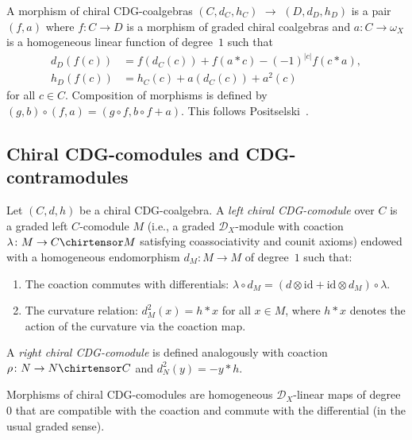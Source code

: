 \begin{remark}
\label{rem:CDG-morphisms}
A morphism of chiral CDG-coalgebras $(C, d_C, h_C)$
$\to$ $(D, d_D, h_D)$ is a pair $(f, a)$ where
$f\colon C \to D$ is a morphism of graded chiral
coalgebras and $a\colon C \to \omega_X$
is a homogeneous linear function of degree~$1$ such
that
\begin{align*}
d_D(f(c)) &= f(d_C(c)) + f(a \ast c) - (-1)^{|c|}f(c \ast a), \\
h_D(f(c)) &= h_C(c) + a(d_C(c)) + a^2(c)
\end{align*}
for all $c \in C$.
Composition of morphisms is defined by
$(g, b) \circ (f, a) = (g \circ f,\allowbreak b \circ f + a)$.
This follows Positselski~\cite[\S4.1]{Positselski11}.
\end{remark}

\subsection{Chiral CDG-comodules and CDG-contramodules}
\label{subsec:chiral-CDG-comod-contra}

\begin{definition}\label{def:chiral-CDG-comodule}
Let $(C, d, h)$ be a chiral CDG-coalgebra.  A \emph{left chiral
CDG-comodule} over $C$ is a graded left $C$-comodule $M$
(i.e., a graded $\mathcal{D}_X$-module with coaction
$\lambda\colon M \to C \chirtensor M$ satisfying coassociativity
and counit axioms) endowed with a homogeneous endomorphism
$d_M\colon M \to M$ of degree~$1$ such that:
\begin{enumerate}
\item The coaction commutes with differentials:
  $\lambda \circ d_M = (d \otimes \mathrm{id} + \mathrm{id} \otimes d_M) \circ \lambda$.
\item The curvature relation:
  $d_M^2(x) = h \ast x$ for all $x \in M$,
  where $h \ast x$ denotes the action of the curvature
  via the coaction map.
\end{enumerate}

A \emph{right chiral CDG-comodule} is defined analogously with
coaction $\rho\colon N \to N \chirtensor C$ and
$d_N^2(y) = -y \ast h$.

Morphisms of chiral CDG-comodules are homogeneous $\mathcal{D}_X$-linear
maps of degree~$0$ that are compatible with the coaction
and commute with the differential (in the usual graded sense).
\end{definition}

